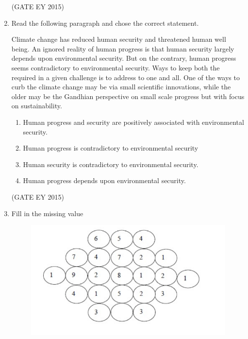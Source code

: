 \documentclass[journal,12pt,onecolumn]{IEEEtran}
\theoremstyle{remark}
\begin{document}
\begin{enumerate}
\begin{enumerate}
    \end{enumerate}
  
\hfill{(GATE EY 2015)}
\item
Read the following paragraph and chose the correct statement.


Climate change has reduced human security and threatened human well being. An ignored reality of human progress is that human security largely depends upon environmental security. But on the contrary, human progress seems contradictory to environmental security. Ways to keep both the required in a given challenge is to address to one and all. One of the ways to curb the climate change may be via small scientific innovations, while the older may be the Gandhian perspective on small scale progress but with focus on sustainability.


\begin{enumerate}
    
\item Human progress and security are positively associated with environmental security.
\item  Human progress is contradictory to environmental security
\item Human security is contradictory to environmental security.
\item Human progress depends upon environmental security.



    \end{enumerate}
    
\hfill{(GATE EY 2015)}
\item 
Fill in the missing value

\begin{figure}[H]
    \centering
    \includegraphics[]{figs/Q.8.png}
    \caption{}
    \label{fig:1}
\end{figure}


\end{enumerate}
\end{document}
